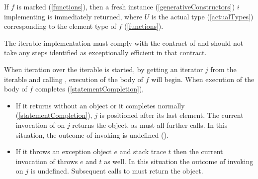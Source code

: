 \documentclass[makeidx]{article}
\begin{document}
{\LMHash{}%
If $f$ is marked \code{\SYNC*} (\ref{functions}),
then a fresh instance (\ref{generativeConstructors}) $i$
implementing  is immediately returned,
where $U$ is the actual type
(\ref{actualTypes})
corresponding to the element type of $f$
(\ref{functions}).


\LMHash{}%
The iterable implementation must comply with
the contract of  and should not
take any steps identified as exceptionally efficient in that contract.


\LMHash{}%
When iteration over the iterable is started, by getting
an iterator $j$ from the iterable and calling ,
execution of the body of $f$ will begin.
When execution of the body of $f$ completes (\ref{statementCompletion}),

\begin{itemize}
\item
  If it returns without an object or it completes normally
  (\ref{statementCompletion}),
  $j$ is positioned after its last element.
  The current invocation of  on $j$
  returns the \FALSE{} object,
  as must all further calls.
  In this situation, the outcome of invoking  is undefined
  ().
\item
  If it throws an exception object $e$ and stack trace $t$ then
  the current invocation of  throws $e$ and $t$ as well.
  In this situation the outcome of invoking  on $j$ is undefined.
  Subsequent calls to  must return the \FALSE{} object.
\end{itemize}

}
\end{document}

